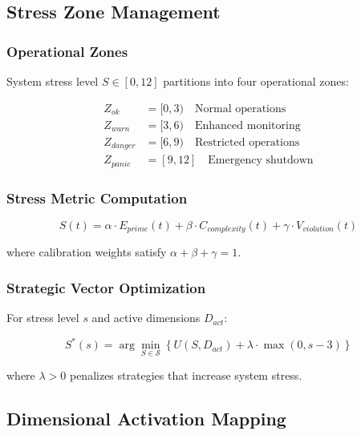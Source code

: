 \documentclass[12pt]{article}
\begin{document}
\subsection{Stress Zone Management}

\subsubsection{Operational Zones}

System stress level $S \in [0,12]$ partitions into four operational zones:

\begin{align}
Z_{ok} &= [0,3) \quad \text{Normal operations} \\
Z_{warn} &= [3,6) \quad \text{Enhanced monitoring} \\
Z_{danger} &= [6,9) \quad \text{Restricted operations} \\
Z_{panic} &= [9,12] \quad \text{Emergency shutdown}
\end{align}

\subsubsection{Stress Metric Computation}

\begin{equation}
S(t) = \alpha \cdot E_{prime}(t) + \beta \cdot C_{complexity}(t) + \gamma \cdot V_{violation}(t)
\end{equation}

where calibration weights satisfy $\alpha + \beta + \gamma = 1$.

\subsubsection{Strategic Vector Optimization}

For stress level $s$ and active dimensions $D_{act}$:

\begin{equation}
S^*(s) = \arg\min_{S \in \mathcal{S}} \left\{ U(S, D_{act}) + \lambda \cdot \max(0, s-3) \right\}
\end{equation}

where $\lambda > 0$ penalizes strategies that increase system stress.

\subsection{Dimensional Activation Mapping}
\end{document}
